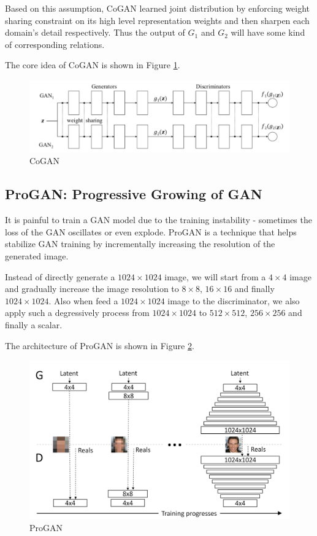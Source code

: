 \documentclass{article} %
\begin{document}
Based on this assumption, CoGAN learned joint distribution by enforcing weight sharing constraint on its high level representation weights and then sharpen each domain's detail respectively. Thus the output of $G_1$ and $G_2$ will have some kind of corresponding relations. 

The core idea of CoGAN is shown in Figure \ref{fig:CoGAN}.

\begin{figure}[h]
	\centering
	\includegraphics[width=0.85\linewidth]{figures/CoGAN.png}
	\caption{CoGAN}
	\label{fig:CoGAN}
\end{figure}

\subsection{ProGAN: Progressive Growing of GAN}

It is painful to train a GAN model due to the training instability - sometimes the loss of the GAN oscillates or even explode. ProGAN is a technique that helps stabilize GAN training by incrementally increasing the resolution of the generated image.

Instead of directly generate a $1024 \times 1024$ image, we will start from a $4 \times 4$ image and gradually increase the image resolution to $8 \times 8$, $16 \times 16$ and finally $1024 \times 1024$. Also when feed a $1024 \times 1024$ image to the discriminator, we also apply such a degressively process from $1024 \times 1024$ to $512 \times 512$, $256 \times 256$ and finally a scalar.

The architecture of ProGAN is shown in Figure \ref{fig:ProGAN}.

\begin{figure}[h]
	\centering
	\includegraphics[width=0.75\linewidth]{figures/ProGAN.png}
	\caption{ProGAN}
	\label{fig:ProGAN}
\end{figure}
\end{document}
